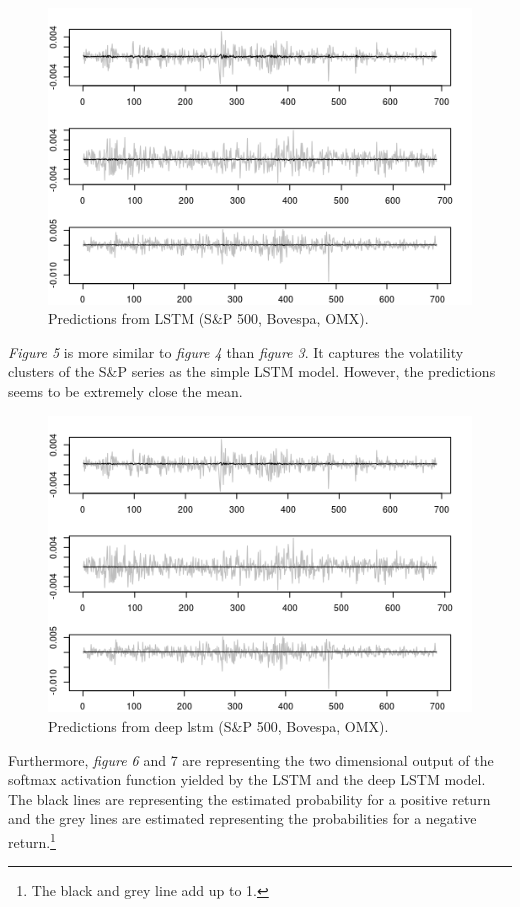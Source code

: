 \documentclass[12pt, letterpaper]{amsart}%
\begin{document}
\begin{figure}[h]%
\caption{Predictions from LSTM (S\&P 500, Bovespa, OMX).}
\centering
\includegraphics[scale=1]{lstm_pred2.png}
\end{figure}

\textit{Figure 5} is more similar to \textit{figure 4} than \textit{figure 3}. It captures the volatility clusters of the S\&P series as the simple LSTM model. However, the predictions seems to be extremely close the mean.
\\

\begin{figure}[h]%
\caption{Predictions from deep lstm (S\&P 500, Bovespa, OMX).}
\centering
\includegraphics[scale=1]{lstm_deep_pred2.png}
\end{figure}

Furthermore, \textit{figure 6} and 7 are representing the two dimensional output of the softmax activation function yielded by the LSTM and the deep LSTM model. The black lines are representing the estimated probability for a positive return and the grey lines are estimated representing the probabilities for a negative return.\footnote{The black and grey line add up to 1.}
\\
\end{document}
